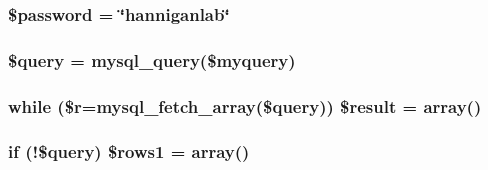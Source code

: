 \subsubsection[{\texorpdfstring{\$password}{$password}}]{\setlength{\rightskip}{0pt plus 5cm}\$password = \char`\"{}hanniganlab\char`\"{}}\hypertarget{_f_i_g__280___j_s_o_n_8php_a607686ef9f99ea7c42f4f3dd3dbb2b0d}{}\label{_f_i_g__280___j_s_o_n_8php_a607686ef9f99ea7c42f4f3dd3dbb2b0d}
\subsubsection[{\texorpdfstring{\$query}{$query}}]{\setlength{\rightskip}{0pt plus 5cm}\$query = mysql\+\_\+query(\$myquery)}\hypertarget{_f_i_g__280___j_s_o_n_8php_af59a5f7cd609e592c41dc3643efd3c98}{}\label{_f_i_g__280___j_s_o_n_8php_af59a5f7cd609e592c41dc3643efd3c98}
\subsubsection[{\texorpdfstring{\$result}{$result}}]{\setlength{\rightskip}{0pt plus 5cm}while (\$r=mysql\+\_\+fetch\+\_\+array(\$query)) \$result = array()}\hypertarget{_f_i_g__280___j_s_o_n_8php_a9148136d1e11f768be4f805d7e567da2}{}\label{_f_i_g__280___j_s_o_n_8php_a9148136d1e11f768be4f805d7e567da2}
\subsubsection[{\texorpdfstring{\$rows1}{$rows1}}]{\setlength{\rightskip}{0pt plus 5cm}if (!\$query) \$rows1 = array()}\hypertarget{_f_i_g__280___j_s_o_n_8php_a15da33e0f4006a60bff01708cb5d1428}{}\label{_f_i_g__280___j_s_o_n_8php_a15da33e0f4006a60bff01708cb5d1428}

